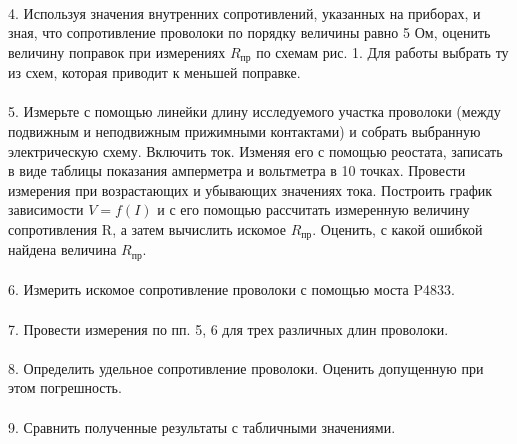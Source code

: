 \documentclass[14pt, a4paper]{scrartcl}
\begin{document}
\paragraph{}
4. Используя значения внутренних сопротивлений, указанных на приборах, и зная, что сопротивление проволоки по порядку величины равно 5 Ом, оценить величину поправок при измерениях $R_\text{пр}$ по схемам рис. 1. Для работы выбрать ту из схем, которая приводит к меньшей поправке.
\paragraph{}
5. Измерьте с помощью линейки длину исследуемого участка проволоки (между подвижным и неподвижным прижимными контактами) и собрать выбранную электрическую схему. Включить ток. Изменяя его с помощью реостата, записать в виде таблицы показания амперметра и вольтметра в 10 точках. Провести измерения при возрастающих и убывающих значениях тока. Построить график зависимости $V = f(I)$ и с его помощью рассчитать измеренную величину сопротивления R, а затем вычислить искомое $R_\text{пр}$. Оценить, с какой ошибкой найдена величина $R_\text{пр}$.
\paragraph{}
6. Измерить искомое сопротивление проволоки с помощью моста P4833. 
\paragraph{}
7. Провести измерения по пп. 5, 6 для трех различных длин проволоки.
\paragraph{}
8. Определить удельное сопротивление проволоки. Оценить допущенную при этом погрешность.
\paragraph{}
9. Сравнить полученные результаты с табличными значениями.
\end{document}
